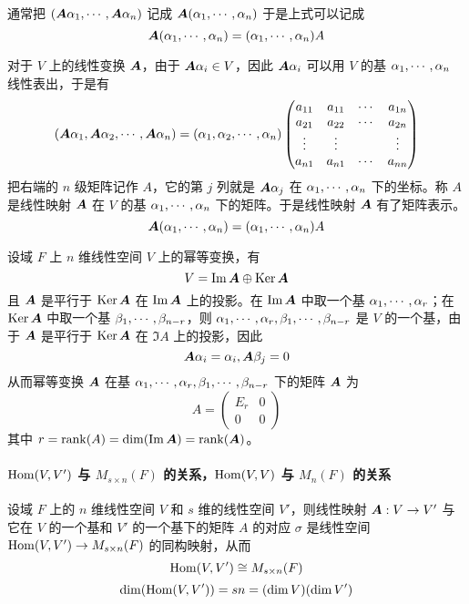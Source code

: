 通常把 $(\boldsymbol{A} \alpha_1,\cdots,\boldsymbol{A} \alpha_n)$ 记成 $\boldsymbol{A}(\alpha_1,\cdots,\alpha_n)$ 于是上式可以记成
\[ \boldsymbol{A}(\alpha_1,\cdots,\alpha_n) = (\alpha_1,\cdots,\alpha_n) A\]

对于 $V$ 上的线性变换 $\boldsymbol{A}$，由于 $\boldsymbol{A} \alpha_i \in V$，因此 $\boldsymbol{A} \alpha_i$ 可以用 $V$ 的基 $\alpha_1,\cdots,\alpha_n$ 线性表出，于是有
\[ 
    \left( \boldsymbol{A} \alpha_1 , \boldsymbol{A} \alpha_2 , \cdots , \boldsymbol{A} \alpha_n \right) = 
    \left( \alpha_1 , \alpha_2 , \cdots , \alpha_n \right)
    \left( \begin{matrix}
        a_{11} & a_{11} & \cdots & a_{1n}\\
        a_{21} & a_{22} & \cdots & a_{2n}\\
        \vdots & \vdots &        & \vdots\\
        a_{n1} & a_{n1} & \cdots & a_{nn}
    \end{matrix} \right)
\]
把右端的 $n$ 级矩阵记作 $A$，它的第 $j$ 列就是 $\boldsymbol{A} \alpha_j$ 在 $\alpha_1,\cdots,\alpha_n$ 下的坐标。称 $A$ 是线性映射 $\boldsymbol{A}$ 在 $V$ 的基 $\alpha_1,\cdots,\alpha_n$ 下的矩阵。于是线性映射 $\boldsymbol{A}$ 有了矩阵表示。
\[ \boldsymbol{A}(\alpha_1,\cdots,\alpha_n) = (\alpha_1,\cdots,\alpha_n) A\]

设域 $F$ 上 $n$ 维线性空间 $V$ 上的幂等变换，有
\[ V = \operatorname{Im} \boldsymbol{A} \oplus \operatorname{Ker} \boldsymbol{A} \]
且 $\boldsymbol{A}$ 是平行于 $\operatorname{Ker} \boldsymbol{A}$ 在 $\operatorname{Im} \boldsymbol{A}$ 上的投影。在 $\operatorname{Im} \boldsymbol{A}$ 中取一个基 $\alpha_1,\cdots,\alpha_r$；在 $\operatorname{Ker} \boldsymbol{A}$ 中取一个基 $\beta_1,\cdots,\beta_{n-r}$，则 $\alpha_1,\cdots,\alpha_r,\beta_1,\cdots,\beta_{n-r}$ 是 $V$ 的一个基，由于 $\boldsymbol{A}$ 是平行于 $\operatorname{Ker} \boldsymbol{A}$ 在 $\Im A$ 上的投影，因此
\[ \boldsymbol{A} \alpha_i = \alpha_i, \boldsymbol{A} \beta_j = 0 \]
从而幂等变换 $\boldsymbol{A}$ 在基 $\alpha_1,\cdots,\alpha_r,\beta_1,\cdots,\beta_{n-r}$ 下的矩阵 $\boldsymbol{A}$ 为
\[ A = \left(\begin{matrix}
    E_r & 0\\
    0   & 0
\end{matrix}\right) \]
其中 $r = \operatorname{rank}(A) = \dim(\operatorname{Im} \boldsymbol{A}) = \operatorname{rank}(\boldsymbol{A})$。

\paragraph{$\operatorname{Hom}(V,V')$ 与 $M_{s \times n}(F)$ 的关系，$\operatorname{Hom}(V,V)$ 与 $M_n(F)$ 的关系}

\begin{theorem}
    设域 $F$ 上的 $n$ 维线性空间 $V$ 和 $s$ 维的线性空间 $V'$，则线性映射 $\boldsymbol{A} : V \to V'$ 与它在 $V$ 的一个基和 $V'$ 的一个基下的矩阵 $A$ 的对应 $\sigma$ 是线性空间 $\operatorname{Hom}(V,V') \to M_{s \times n}(F)$ 的同构映射，从而
    \[ \operatorname{Hom}(V,V') \cong M_{s \times n}(F) \]
    \[ \dim(\operatorname{Hom}(V,V')) = sn = (\dim V)(\dim V') \]
\end{theorem}


